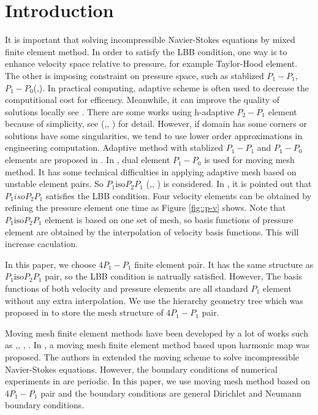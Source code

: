 \documentclass[mathpazo]{aamm}
\begin{document}
\section{Introduction}
    \label{sec1} It is important that solving incompressible
    Navier-Stokes equations by mixed finite element method. In order to
    satisfy the LBB condition, one way is to enhance velocity space
    relative to pressure, for example Taylor-Hood element. The other is imposing
    constraint on pressure space, such as stablized $P_1-P_1$,
    $P_1-P_0$(\cite{li2009performance},\cite{bochev2006stabilization}). 
    In practical computing, adaptive scheme is often used to decrease the
    computitional cost for efficency. Meanwhile, it can improve the quality
    of solutions locally see \cite{popiolek2006numerical}. There are some works
    using h-adaptive $P_2-P_1$ element because of simplicity, see
    (\cite{danaila2014newton},\cite{ebeida2009unsteady},
    \cite{berrone2009space}) for detail. However, if domain has some
    corners or solutions have some singularities, we tend to use lower
    order approximations in engineering computation. Adaptive method with
    stablized $P_1-P_1$ and $P_1-P_0$ elements are proposed in
    \cite{zheng2010posteriori}. In \cite{di2005moving},
    dual element $P_1-P_0$ is used for moving mesh method. It has some 
    technical difficulties in applying adaptive mesh based on unstable
    element pairs. So $P_1\text{iso}P_2P_1$
    (\cite{fujima1998iso},\cite{bercovier1979error},
    \cite{vanden2009kinetic}) is considered. In
    \cite{bercovier1979error}, it is pointed out that
    $P_1isoP_2P_1$  satisfies the LBB condition. Four velocity
    elements can be obtained by refining the pressure element one
    time as Figure \ref{fig::p-v} shows. Note that
    $P_1\text{iso}P_2P_1$ element is based on one set of mesh, so
    basis functions of pressure element are obtained by the
    interpolation of velocity basis functions. This will increase
    caculation.
    
    In this paper, we choose $4P_1-P_1$ finite element pair. It has the
    same structure as $P_1\text{iso}P_2P_1$ pair, so the LBB condition
    is natrually satisfied. However, The basis functions of both
    velocity and pressure elements are all standard $P_1$ element
    without any extra interpolation. We use the hierarchy
    geometry tree which was proposed in \cite{li2005multi} to store
    the mesh structure of  $4P_1-P_1$ pair.

    Moving mesh finite element methods have been developed by a lot
    of works such as
    \cite{Winslow1966NUMERICAL},\cite{dvinsky1991adaptive}, \cite{cao1999anr},
    \cite{li2001mesh}. In \cite{li2001mesh}, a moving mesh finite element
    method based upon harmonic map was proposed. The authors in \cite{di2005moving}
    extended the moving scheme to solve incompressible Navier-Stokes
    equations. However, the boundary conditions of numerical
    experiments in \cite{di2005moving} are periodic. In this paper, we
    use moving mesh method based on $4P_1-P_1$ pair and the boundary
    conditions are general Dirichlet and Neumann boundary conditions.
\end{document}
